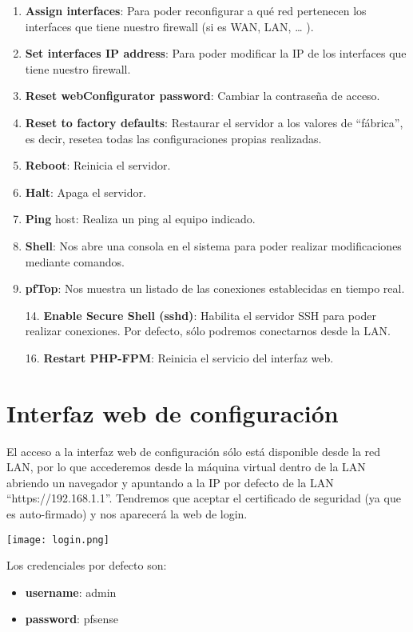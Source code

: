 \begin{enumerate}
    \item \textbf{Assign interfaces}: Para poder reconfigurar a qué red pertenecen los interfaces que tiene nuestro firewall (si es WAN, LAN, … ).
    \item \textbf{Set interfaces IP address}: Para poder modificar la IP de los interfaces que tiene nuestro firewall.
    \item \textbf{Reset webConfigurator password}: Cambiar la contraseña de acceso.
    \item \textbf{Reset to factory defaults}: Restaurar el servidor a los valores de “fábrica”, es decir, resetea todas las configuraciones propias realizadas.
    \item \textbf{Reboot}: Reinicia el servidor.
    \item \textbf{Halt}: Apaga el servidor.
    \item \textbf{Ping} host: Realiza un ping al equipo indicado.
    \item \textbf{Shell}: Nos abre una consola en el sistema para poder realizar modificaciones mediante comandos.
    \item \textbf{pfTop}: Nos muestra un listado de las conexiones establecidas en tiempo real.
    \item[14.] \textbf{Enable Secure Shell (sshd)}: Habilita el servidor SSH para poder realizar conexiones. Por defecto, sólo podremos conectarnos desde la LAN.
    \item[16.] \textbf{Restart PHP-FPM}: Reinicia el servicio del interfaz web.
\end{enumerate}

\section{Interfaz web de configuración}
El acceso a la interfaz web de configuración sólo está disponible desde la red LAN, por lo que accederemos desde la máquina virtual dentro de la LAN abriendo un navegador y apuntando a la IP por defecto de la LAN “https://192.168.1.1”. Tendremos que aceptar el certificado de seguridad (ya que es auto-firmado) y nos aparecerá la web de login.

\begin{center}
    \texttt{[image: login.png]}
\end{center}

Los credenciales por defecto son:
\begin{itemize}
    \item \textbf{username}: admin
    \item \textbf{password}: pfsense
\end{itemize}

